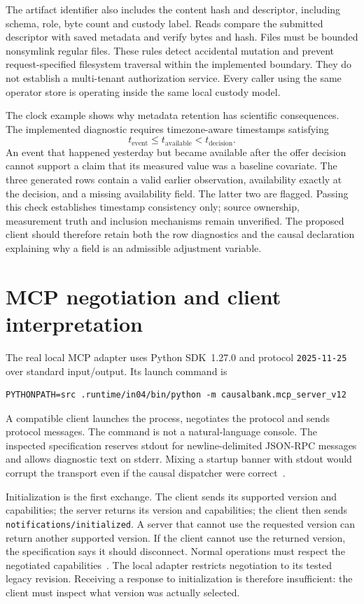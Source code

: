 The artifact identifier also includes the content hash and descriptor,
including schema, role, byte count and custody label. Reads compare the
submitted descriptor with saved metadata and verify bytes and hash. Files
must be bounded nonsymlink regular files. These rules detect accidental
mutation and prevent request-specified filesystem traversal within the
implemented boundary. They do not establish a multi-tenant authorization
service. Every caller using the same operator store is operating inside
the same local custody model.

The clock example shows why metadata retention has scientific consequences.
The implemented diagnostic requires timezone-aware timestamps satisfying
\[
 t_{\mathrm{event}}\leq t_{\mathrm{available}}<t_{\mathrm{decision}}.
\]
An event that happened yesterday but became available after the offer decision
cannot support a claim that its measured value was a baseline covariate.
The three generated rows contain a valid earlier observation, availability
exactly at the decision, and a missing availability field. The latter two
are flagged. Passing this check establishes timestamp consistency only;
source ownership, measurement truth and inclusion mechanisms remain unverified.
The proposed client should therefore retain both the row diagnostics and the
causal declaration explaining why a field is an admissible adjustment variable.

\section{MCP negotiation and client interpretation}

The real local MCP adapter uses Python SDK~1.27.0 and protocol
\texttt{2025-11-25} over standard input/output. Its launch command is
\begin{lstlisting}
PYTHONPATH=src .runtime/in04/bin/python -m causalbank.mcp_server_v12
\end{lstlisting}
A compatible client launches the process, negotiates the protocol and sends
protocol messages. The command is not a natural-language console. The
inspected specification reserves stdout for newline-delimited JSON-RPC
messages and allows diagnostic text on stderr. Mixing a startup banner with
stdout would corrupt the transport even if the causal dispatcher were
correct~\citep{v12_mcp_legacy_stdio}.

Initialization is the first exchange. The client sends its supported version
and capabilities; the server returns its version and capabilities; the client
then sends \texttt{notifications/initialized}. A server that cannot use the
requested version can return another supported version. If the client cannot
use the returned version, the specification says it should disconnect.
Normal operations must respect the negotiated capabilities~\citep{v12_mcp_legacy_lifecycle}. The local adapter restricts negotiation to its
tested legacy revision. Receiving a response to initialization is therefore
insufficient: the client must inspect what version was actually selected.

